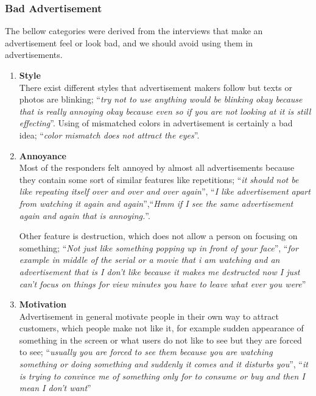 


\subsubsection{Bad Advertisement}
The bellow categories were derived from the interviews that make an advertisement feel or look bad, and we should avoid using them in advertisements.

\begin{enumerate}
\item \textbf{Style} \\
There exist different styles that advertisement makers follow but texts or photos are blinking; ``\emph{try not to use anything would be blinking okay because that is really annoying okay because even so if you are not looking at it is still effecting}''. Using of mismatched colors in advertisement is certainly a bad idea; ``\emph{color mismatch does not attract the eyes}''.

\item \textbf{Annoyance} \\
Most of the responders felt annoyed by almost all advertisements because they contain some sort of similar features like repetitions; ``\emph{it should not be like repeating itself over and over and over again}'', ``\emph{I like advertisement apart from watching it again and again}'',``\emph{Hmm if I see the same advertisement again and again that is annoying.}''. 

Other feature is destruction, which does not allow a person on focusing on something; ``\emph{Not just like something popping up in front of your face}'', ``\emph{for example in middle of the serial or a movie that i am watching and an advertisement that is I don't like because it makes me destructed now I just can't focus on things for view minutes you have to leave what ever you were}''

\item \textbf{Motivation} \\
Advertisement in general motivate people in their own way to attract customers, which people make not like it, for example sudden appearance of something in the screen or what users do not like to see but they are forced to see; ``\emph{usually you are forced to see them because you are watching something or doing something and suddenly it comes and it disturbs you}'', ``\emph{it is trying to convince me of something only for to consume or buy and then I mean I don't want}''


\end{enumerate}
